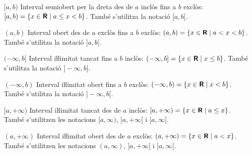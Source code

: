 \begin{list}{}
     \item[{$[a,b)$}] Interval semiobert per la dreta des de $a$ inclòs fins a $b$ exclòs: $[a,b) = \{x \in {\ensuremath{\boldsymbol{\mathsf{R}}}} \mid a \leq x < b\}$. També s'utilitza la notació $[a,b[$.
     \item[{$(a,b)$}] Interval obert des de $a$ exclòs fins a $b$ exclòs: $(a,b) = \{x \in {\ensuremath{\boldsymbol{\mathsf{R}}}} \mid a < x < b\}$. També s'utilitza la notació $]a,b[$.
     \item[{$(-\infty,b]$}] Interval iŀlimitat tancat fins a $b$ inclòs: $(-\infty,b] = \{x \in {\ensuremath{\boldsymbol{\mathsf{R}}}} \mid x \leq b\}$.  També s'utilitza la notació $]-\infty,b]$.
     \item[{$(-\infty,b)$}] Interval iŀlimitat obert fins a $b$ exclòs: $(-\infty,b) = \{x \in {\ensuremath{\boldsymbol{\mathsf{R}}}} \mid x < b\}$. També s'utilitza la notació $]-\infty,b[$.
     \item[{$[a,+\infty)$}] Interval iŀlimitat tancat des de $a$ inclòs: $[a, +\infty) = \{x \in {\ensuremath{\boldsymbol{\mathsf{R}}}} \mid a \leq x\}$. També s'utilitzen les notacions $[a, \infty)$, $[a, +\infty[$ i $[a, \infty[$.
	 \item[{$(a,+\infty)$}] Interval iŀlimitat obert des de $a$ exclòs: $(a, +\infty) = \{x \in {\ensuremath{\boldsymbol{\mathsf{R}}}} \mid a < x\}$. També s'utilitzen les notacions $(a, \infty)$, $]a, +\infty[$ i $]a, \infty[$.
\end{list}
 
 
 
 
 
 
 
 
 
 
